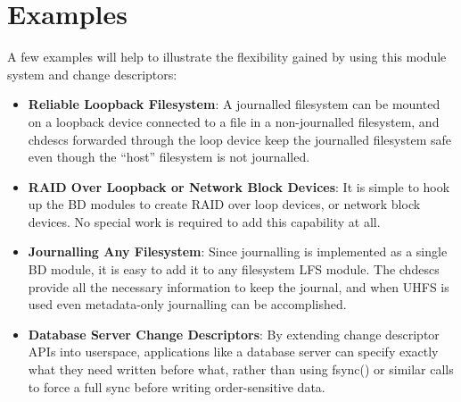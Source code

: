 \section{Examples}
\label{sec:examples}

A few examples will help to illustrate the flexibility gained by using this
module system and change descriptors:

\begin{itemize}
\item \itemvspace{} {\bf Reliable Loopback Filesystem}: A journalled filesystem
  can be mounted on a loopback device connected to a file in a non-journalled
  filesystem, and chdescs forwarded through the loop device keep the journalled
  filesystem safe even though the ``host'' filesystem is not journalled.
\item \itemvspace{} {\bf RAID Over Loopback or Network Block Devices}: It is
  simple to hook up the BD modules to create RAID over loop devices, or network
  block devices. No special work is required to add this capability at all.
\item \itemvspace{} {\bf Journalling Any Filesystem}: Since journalling is
  implemented as a single BD module, it is easy to add it to any filesystem LFS
  module. The chdescs provide all the necessary information to keep the journal,
  and when UHFS is used even metadata-only journalling can be accomplished.
\item \itemvspace{} {\bf Database Server Change Descriptors}: By extending
  change descriptor APIs into userspace, applications like a database server can
  specify exactly what they need written before what, rather than using fsync()
  or similar calls to force a full sync before writing order-sensitive data.
\end{itemize}
\postlistspacing{}
